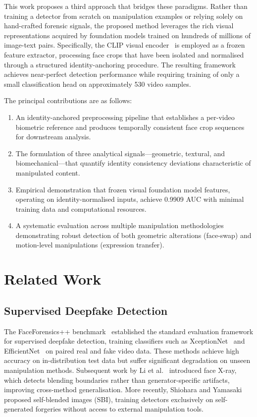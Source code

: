 \documentclass[11pt, twocolumn]{article}
\begin{document}
This work proposes a third approach that bridges these paradigms. Rather than training a detector from scratch on manipulation examples or relying solely on hand-crafted forensic signals, the proposed method leverages the rich visual representations acquired by foundation models trained on hundreds of millions of image-text pairs. Specifically, the CLIP visual encoder~\cite{radford2021clip} is employed as a frozen feature extractor, processing face crops that have been isolated and normalised through a structured identity-anchoring procedure. The resulting framework achieves near-perfect detection performance while requiring training of only a small classification head on approximately 530 video samples.

The principal contributions are as follows:

\begin{enumerate}
\item An identity-anchored preprocessing pipeline that establishes a per-video biometric reference and produces temporally consistent face crop sequences for downstream analysis.
\item The formulation of three analytical signals---geometric, textural, and biomechanical---that quantify identity consistency deviations characteristic of manipulated content.
\item Empirical demonstration that frozen visual foundation model features, operating on identity-normalised inputs, achieve 0.9909 AUC with minimal training data and computational resources.
\item A systematic evaluation across multiple manipulation methodologies demonstrating robust detection of both geometric alterations (face-swap) and motion-level manipulations (expression transfer).
\end{enumerate}

\section{Related Work}

\subsection{Supervised Deepfake Detection}

The FaceForensics++ benchmark~\cite{rossler2019faceforensics} established the standard evaluation framework for supervised deepfake detection, training classifiers such as XceptionNet~\cite{chollet2017xception} and EfficientNet~\cite{tan2019efficientnet} on paired real and fake video data. These methods achieve high accuracy on in-distribution test data but suffer significant degradation on unseen manipulation methods. Subsequent work by Li et al.~\cite{li2020face} introduced face X-ray, which detects blending boundaries rather than generator-specific artifacts, improving cross-method generalisation. More recently, Shiohara and Yamasaki~\cite{shiohara2022sbi} proposed self-blended images (SBI), training detectors exclusively on self-generated forgeries without access to external manipulation tools.
\end{document}
